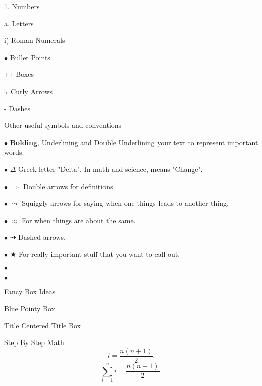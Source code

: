 \documentclass[../main.tex]{subfiles}
\begin{document}
\begin{outline}[enumerate]
\begin{displayquote}
	1. Numbers

	\quad a. Letters

	\quad \quad i) Roman Numerals

	\quad \(\bullet\) Bullet Points

	\quad \quad $\Box$ Boxes

	\quad $\rotatebox[origin=c]{180}{$\Lsh$}$ Curly Arrows

	\quad \quad - Dashes
	\end{displayquote}


	\1 Other useful symbols and conventions

	$\bullet$ \quad \textbf{Bolding}, \underline{Underlining} and \underline{\underline{Double Underlining}} your text to represent important words.

	$\bullet$ \quad $\Delta$ Greek letter "Delta".  In math and science, means "Change".

	$\bullet$ \quad $\Rightarrow$ Double arrows for definitions.

	$\bullet$ \quad $\leadsto$ Squiggly arrows for saying when one things leads to another thing.

	$\bullet$ \quad $\approx$ For when things are about the same.

	$\bullet$ \quad $\dashrightarrow$ Dashed arrows.

	$\bullet$ \quad $\bigstar$ For really important stuff that you want to call out.

	$\bullet$ \quad {}

	$\bullet$ \quad {}

	\1 Fancy Box Ideas

	\begin{boxbluepointy}
		Blue Pointy Box
	\end{boxbluepointy}

	\begin{boxboxtitle}{Title}
		Centered Title Box
	\end{boxboxtitle}

	\begin{boxcompare}{Step By Step Math}
		\begin{equation}
		i = \frac{n(n+1)}{2}.
		\end{equation}
		\tcblower
		\begin{equation}
		\sum\limits_{i=1}^n i = \frac{n(n+1)}{2}.
		\end{equation}
	\end{boxcompare}




\end{outline}
\end{document}
